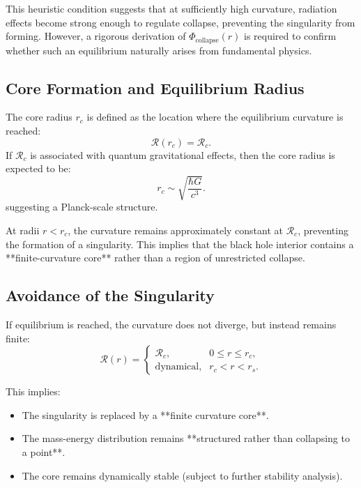 This heuristic condition suggests that at sufficiently high curvature, radiation effects become strong enough to regulate collapse, preventing the singularity from forming. However, a rigorous derivation of \( \Phi_{\text{collapse}}(r) \) is required to confirm whether such an equilibrium naturally arises from fundamental physics.

\subsection{Core Formation and Equilibrium Radius}

The core radius \( r_c \) is defined as the location where the equilibrium curvature is reached:
\begin{equation}
    \mathcal{R}(r_c) = \mathcal{R}_c.
\end{equation}
If \( \mathcal{R}_c \) is associated with quantum gravitational effects, then the core radius is expected to be:
\begin{equation}
    r_c \sim \sqrt{\frac{\hbar G}{c^3}}.
\end{equation}
suggesting a Planck-scale structure.

At radii \( r < r_c \), the curvature remains approximately constant at \( \mathcal{R}_c \), preventing the formation of a singularity. This implies that the black hole interior contains a **finite-curvature core** rather than a region of unrestricted collapse.

\subsection{Avoidance of the Singularity}

If equilibrium is reached, the curvature does not diverge, but instead remains finite:
\begin{equation}
    \mathcal{R}(r) =
    \begin{cases}
        \mathcal{R}_c, & 0 \leq r \leq r_c, \\
        \text{dynamical}, & r_c < r < r_s.
    \end{cases}
\end{equation}

This implies:
\begin{itemize}
    \item The singularity is replaced by a **finite curvature core**.
    \item The mass-energy distribution remains **structured rather than collapsing to a point**.
    \item The core remains dynamically stable (subject to further stability analysis).
\end{itemize}

